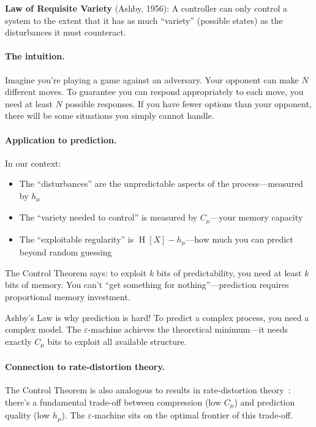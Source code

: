 \documentclass[11pt,a4paper]{article}
\theoremstyle{definition}
\theoremstyle{plain}
\newcommand{\eps}{\varepsilon}
\newcommand{\Cmu}{C_\mu}
\newcommand{\hmu}{h_\mu}
\DeclareMathOperator{\Ent}{H}
\begin{document}
\begin{keyidea}
\textbf{Law of Requisite Variety} (Ashby, 1956): A controller can only control a system to the extent that it has as much ``variety'' (possible states) as the disturbances it must counteract.
\end{keyidea}

\paragraph{The intuition.} Imagine you're playing a game against an adversary. Your opponent can make $N$ different moves. To guarantee you can respond appropriately to each move, you need at least $N$ possible responses. If you have fewer options than your opponent, there will be some situations you simply cannot handle.

\paragraph{Application to prediction.} In our context:
\begin{itemize}[nosep]
    \item The ``disturbances'' are the unpredictable aspects of the process---measured by $\hmu$
    \item The ``variety needed to control'' is measured by $\Cmu$---your memory capacity
    \item The ``exploitable regularity'' is $\Ent[X] - \hmu$---how much you can predict beyond random guessing
\end{itemize}

The Control Theorem says: to exploit $k$ bits of predictability, you need at least $k$ bits of memory. You can't ``get something for nothing''---prediction requires proportional memory investment.

\begin{intuition}
Ashby's Law is why prediction is hard! To predict a complex process, you need a complex model. The $\eps$-machine achieves the theoretical minimum---it needs exactly $\Cmu$ bits to exploit all available structure.
\end{intuition}

\paragraph{Connection to rate-distortion theory.}
The Control Theorem is also analogous to results in rate-distortion theory~\cite{cover2006elements}: there's a fundamental trade-off between compression (low $\Cmu$) and prediction quality (low $\hmu$). The $\eps$-machine sits on the optimal frontier of this trade-off.
\end{document}
